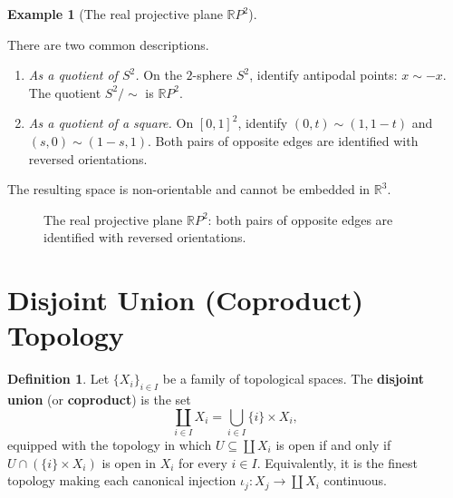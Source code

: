 \documentclass[11pt,a4paper,twoside]{book}
\theoremstyle{remark}
\theoremstyle{definition}
\newtheorem{exampleplain}[theorem]{Example}
\theoremstyle{definition}
\newtheorem{definition}{Definition}[section]
\newenvironment{example}[1][]{%
  \begin{exampleplain}[#1]\itshape
}{%
  \end{exampleplain}
}
\begin{document}
\begin{example}[The real projective plane $\mathbb{R}P^2$]
\label{ex:RP2-quotient}
There are two common descriptions.
\begin{enumerate}
\item \emph{As a quotient of $S^2$.}\;
      On the $2$-sphere $S^2$, identify antipodal points:
      $x\sim -x$.  The quotient $S^2/{\sim}$ is $\mathbb{R}P^2$.
\item \emph{As a quotient of a square.}\;
      On $[0,1]^2$, identify $(0,t)\sim(1,1-t)$ and
      $(s,0)\sim(1-s,1)$.  Both pairs of opposite edges are
      identified with reversed orientations.
\end{enumerate}
The resulting space is non-orientable and cannot be embedded
in $\mathbb{R}^3$.
\end{example}

\begin{figure}[ht]
\centering
{}
\caption{The real projective plane $\mathbb{R}P^2$: both pairs
of opposite edges are identified with reversed orientations.}
\label{fig:RP2-quotient}
\end{figure}

\section{Disjoint Union (Coproduct) Topology}
\label{sec:disjoint-union}

\begin{definition}\label{def:disjoint-union}
Let $\{X_i\}_{i\in I}$ be a family of topological spaces.  The
\textbf{disjoint union} (or \textbf{coproduct}) is the set
\[
   \coprod_{i\in I}X_i = \bigcup_{i\in I}\{i\}\times X_i,
\]
equipped with the topology in which $U\subseteq\coprod X_i$ is open
if and only if $U\cap(\{i\}\times X_i)$ is open in $X_i$ for every
$i\in I$.  Equivalently, it is the finest topology making each
canonical injection $\iota_j\colon X_j\to\coprod X_i$ continuous.
\end{definition}
\end{document}

